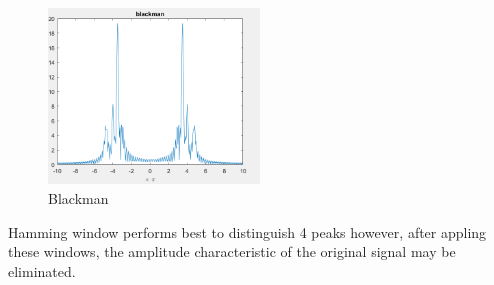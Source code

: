 \documentclass[twoside]{article}
\begin{document}
\begin{figure}[H]
   \centering
   \includegraphics[width = 0.5\textwidth]{./data/blackman.png}  
   \caption{Blackman}
\end{figure}
Hamming window performs best to distinguish 4 peaks however, after appling these windows, the amplitude characteristic of the original signal may be eliminated.\\ 
\end{document}
